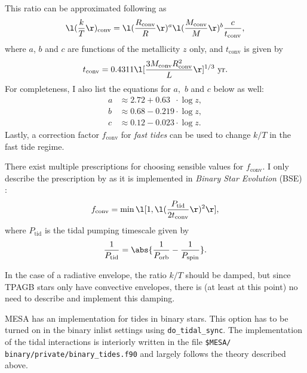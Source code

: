 \documentclass[a4paper,10pt]{article}
\begin{document}
This ratio can be approximated following \citet{preece2022} as
\begin{equation}\label{eq:kovert}
    \l(\frac{k}{T}\r)_\text{conv} = \l(\frac{R_\text{conv}}{R}\r)^{a} \l(\frac{M_\text{conv}}{M}\r)^{b} \frac{c}{t_\text{conv}},
\end{equation}
where \(a\), \(b\) and \(c\) are functions of the metallicity \(z\) only, and \(t_\text{conv}\) is given by
\begin{equation}\label{eq:tconv}
    t_\text{conv} = 0.4311 \l[ \frac{3 M_\text{conv} R_\text{conv}^{2} }{L}\r]^{1 / 3} \text{ yr}.
\end{equation}
For completeness, I also list the equations for \(a, \) \(b\) and \(c\) below as well:
\begin{align*}
    a & \approx  2.72 + 0.63\phantom{0}\cdot \log z,\\
    b & \approx 0.68 - 0.219\cdot \log z,\\
    c & \approx 0.12 - 0.023\cdot \log z.
\end{align*}
Lastly, a correction factor \(f_\text{conv}\) for \emph{fast tides} can be used to change \(k / T\) in the fast tide regime.

There exist multiple prescriptions for choosing sensible values for \(f_\text{conv}\). I only describe the prescription by \citet{goldreich1989} as it is implemented in \emph{Binary Star Evolution} (BSE)  \citep{hurley1902}:
\begin{equation*}
    f_\text{conv} = \min \l[1, \l(\frac{P_\text{tid}}{2 t_\text{conv}}\r)^{2} \r],
\end{equation*}
where \(P_\text{tid}\) is the tidal pumping timescale given by
\begin{equation*}
    \frac{1}{P_\text{tid}} = \abs{\frac{1}{P_\text{orb}} - \frac{1}{P_\text{spin}}}.
\end{equation*}

In the case of a radiative envelope, the ratio \(k / T\) should be damped, but since TPAGB stars only have convective envelopes, there is (at least at this point) no need to describe and implement this damping.


MESA has an implementation for tides in binary stars. This option has to be turned on in the binary inlist settings using \lstinline[style=output, breaklines=true]|do_tidal_sync|.
The implementation of the tidal interactions is interiorly written in the file \lstinline[style=output, breaklines=true]|$MESA/ binary/private/binary_tides.f90| and largely follows the theory described above.
\end{document}
